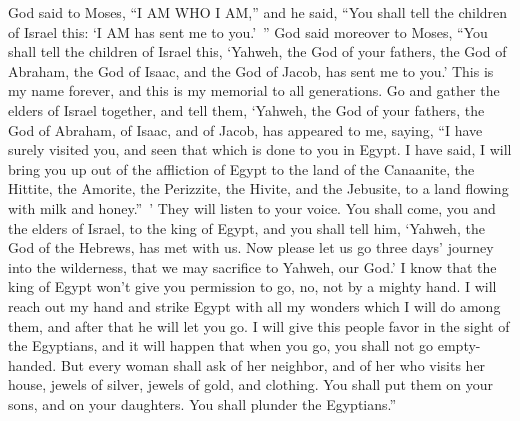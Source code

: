 {\par }{\PP {}God said to Moses, “I AM WHO I AM,” and he said, “You shall tell the children of Israel this: ‘I AM has sent me to you.’ ”
God said moreover to Moses, “You shall tell the children of Israel this, ‘Yahweh, the God of your fathers, the God of Abraham, the God of Isaac, and the God of Jacob, has sent me to you.’ This is my name forever, and this is my memorial to all generations.
Go and gather the elders of Israel together, and tell them, ‘Yahweh, the God of your fathers, the God of Abraham, of Isaac, and of Jacob, has appeared to me, saying, “I have surely visited you, and seen that which is done to you in Egypt.
I have said, I will bring you up out of the affliction of Egypt to the land of the Canaanite, the Hittite, the Amorite, the Perizzite, the Hivite, and the Jebusite, to a land flowing with milk and honey.” ’
They will listen to your voice. You shall come, you and the elders of Israel, to the king of Egypt, and you shall tell him, ‘Yahweh, the God of the Hebrews, has met with us. Now please let us go three days’ journey into the wilderness, that we may sacrifice to Yahweh, our God.’
I know that the king of Egypt won’t give you permission to go, no, not by a mighty hand.
I will reach out my hand and strike Egypt with all my wonders which I will do among them, and after that he will let you go.
I will give this people favor in the sight of the Egyptians, and it will happen that when you go, you shall not go empty-handed.
But every woman shall ask of her neighbor, and of her who visits her house, jewels of silver, jewels of gold, and clothing. You shall put them on your sons, and on your daughters. You shall plunder the Egyptians.”

}
